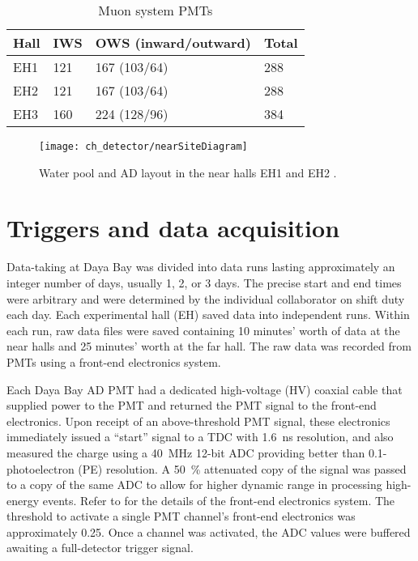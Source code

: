 \begin{table}[ht]
    \centering
    \begin{tabular}[t]{llll}
        \toprule
        Hall & IWS & OWS (inward/outward) & Total\\
        \midrule
        EH1 & 121 & 167 (103/64) & 288\\
        EH2 & 121 & 167 (103/64) & 288\\
        EH3 & 160 & 224 (128/96) & 384\\
        \bottomrule
    \end{tabular}
    \caption[Muon system PMTs]{Muon system PMTs \cite{muonsystem2015}}
    \label{tab:wp_pmts}
\end{table}

\begin{figure}
    \centering
    \texttt{[image: ch\_detector/nearSiteDiagram]}
    \caption[Water pool and AD layout]{
        Water pool and AD layout in the near halls EH1 and EH2
        \cite{sidebyside}.
    }
    \label{fig:wpcutout}
\end{figure}



\section{Triggers and data acquisition}
\label{sec:daq}

Data-taking at Daya Bay was divided into data runs
lasting approximately an integer number of days,
usually 1, 2, or 3 days.
The precise start and end times were arbitrary
and were determined by the individual collaborator
on shift duty each day.
Each experimental hall (EH) saved data into independent runs.
Within each run, raw data files were saved containing 10 minutes' worth of data
at the near halls and 25 minutes' worth at the far hall.
The raw data was recorded from PMTs using a front-end electronics system.

Each Daya Bay AD PMT had a dedicated high-voltage (HV) coaxial cable
that supplied power to the PMT and returned the PMT signal to the
front-end electronics.
Upon receipt of an above-threshold PMT signal, these electronics immediately
issued a ``start'' signal to a TDC with \SI{1.6}{\ns} resolution,
and also measured the charge using a \SI{40}{\MHz} \num{12}-bit ADC
providing better than \num{0.1}-photoelectron (PE) resolution.
A \SI{50}{\percent} attenuated copy of the signal was passed to a copy
of the same ADC to allow for higher dynamic range in processing high-energy
events.
Refer to \cite{sidebyside,ngd2016} for the details
of the front-end electronics system.
The threshold to activate a single PMT channel's front-end electronics
was approximately \SI{0.25}{\pe}.
Once a channel was activated, the ADC values were buffered
awaiting a full-detector trigger signal.


